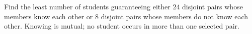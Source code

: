 Find the least number of students guaranteeing either $24$ disjoint pairs whose members know each other or $8$ disjoint pairs whose members do not know each other. Knowing is mutual; no student occurs in more than one selected pair.
